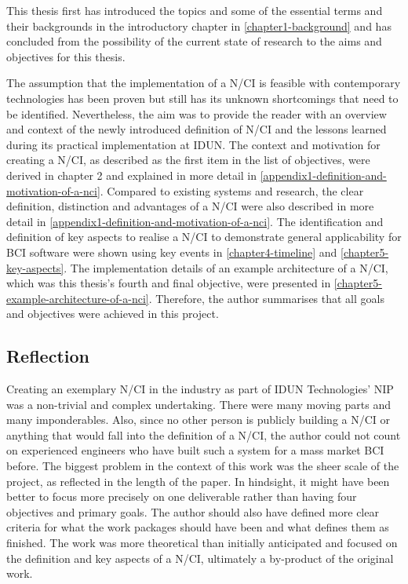 This thesis first has introduced the topics and some of the essential terms and their backgrounds in the introductory chapter in \autoref{chapter1-background} and has concluded from the possibility of the current state of research to the aims and objectives for this thesis.

The assumption that the implementation of a N/CI is feasible with contemporary technologies has been proven but still has its unknown shortcomings that need to be identified. Nevertheless, the aim was to provide the reader with an overview and context of the newly introduced definition of N/CI and the lessons learned during its practical implementation at IDUN. The context and motivation for creating a N/CI, as described as the first item in the list of objectives, were derived in chapter 2 and explained in more detail in \autoref{appendix1-definition-and-motivation-of-a-nci}. Compared to existing systems and research, the clear definition, distinction and advantages of a N/CI were also described in more detail in \autoref{appendix1-definition-and-motivation-of-a-nci}. The identification and definition of key aspects to realise a N/CI to demonstrate general applicability for BCI software were shown using key events in \autoref{chapter4-timeline} and \autoref{chapter5-key-aspects}. The implementation details of an example architecture of a N/CI, which was this thesis's fourth and final objective, were presented in \autoref{chapter5-example-architecture-of-a-nci}. Therefore, the author summarises that all goals and objectives were achieved in this project.

\subsection{Reflection}
\label{chapter5-reflection}

Creating an exemplary N/CI in the industry as part of IDUN Technologies' NIP was a non-trivial and complex undertaking. There were many moving parts and many imponderables. Also, since no other person is publicly building a N/CI or anything that would fall into the definition of a N/CI, the author could not count on experienced engineers who have built such a system for a mass market BCI before. The biggest problem in the context of this work was the sheer scale of the project, as reflected in the length of the paper. In hindsight, it might have been better to focus more precisely on one deliverable rather than having four objectives and primary goals. The author should also have defined more clear criteria for what the work packages should have been and what defines them as finished. The work was more theoretical than initially anticipated and focused on the definition and key aspects of a N/CI, ultimately a by-product of the original work.


